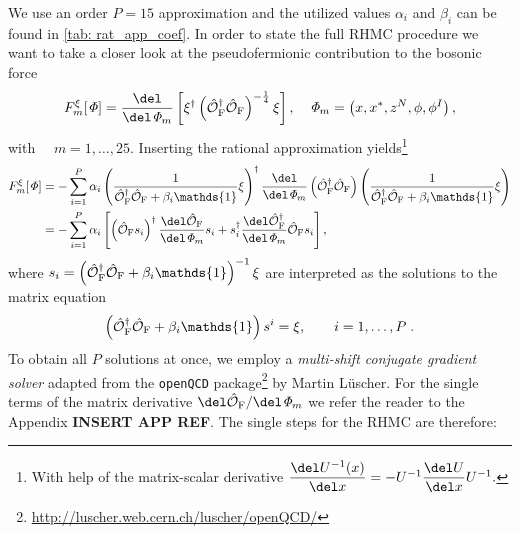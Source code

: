 %
%
We use an order $P=15$ approximation and the utilized values $\alpha_{i}$ and $\beta_{i}$ can be found in \autoref{tab: rat_app_coef}. In order to state the full RHMC procedure we want to take  a closer look at the pseudofermionic contribution to the bosonic force
%
%
\begin{equation}
F_{m}^{\xi}[\mathit{\Phi}] = \frac{\del }{\del \mathit{\Phi}_{m}}\left[ \xi^{\dagger}\left(\hat{\mathcal{O}}_{\rm F}^{\dagger}\hat{\mathcal{O}}_{\rm F}\right)^{-\frac{1}{4}} \xi \right], \quad \mathit{\Phi}_{m} = \left(x,x^{*},z^{N},\phi,\phi^{I}\right),
\end{equation}
%
%
with $\quad m=1,\ldots,25$. Inserting the rational approximation yields\footnote{With help of the matrix-scalar derivative 
$\dfrac{\del U^{-1}(x)}{\del x} = -U^{-1}\dfrac{\del U}{\del x} U^{-1}.$ \vspace{0.2cm}}
%
%
\begin{equation}
\begin{alignedat}{2}
F_{m}^{\xi}[\mathit{\Phi}] &= - \sum\limits_{i=1}^{P} \alpha_{i} \left(\frac{1}{\hat{\mathcal{O}}_{\rm F}^{\dagger}\hat{\mathcal{O}}_{\rm F}+\beta_{i}\mathds{1}} \xi \right)^{\dagger} \frac{\del }{\del \mathit{\Phi}_{m}}\left(\hat{\mathcal{O}}_{\rm F}^{\dagger}\hat{\mathcal{O}}_{\rm F}\right) \left(\frac{1}{\hat{\mathcal{O}}_{\rm F}^{\dagger}\hat{\mathcal{O}}_{\rm F}+\beta_{i}\mathds{1}} \xi \right) \\
%
%
&= -\sum\limits_{i=1}^{P} \alpha_{i}\left[ \left(\hat{\mathcal{O}}_{\rm F} s_{i}\right)^{\dagger} \frac{\del \hat{\mathcal{O}}_{\rm F}}{\del \mathit{\Phi}_{m}} s_{i} + s_{i}^{\dagger} \frac{\del \hat{\mathcal{O}}_{\rm F}^{\dagger}}{\del \mathit{\Phi}_{m}} \hat{\mathcal{O}}_{\rm F} s_{i} \right],
\end{alignedat}
\end{equation}
%
%
where $s_{i}= \left(\hat{\mathcal{O}}_{\rm F}^{\dagger}\hat{\mathcal{O}}_{\rm F}+\beta_{i}\mathds{1}\right)^{-1}\xi$ are interpreted as the solutions to the matrix equation
%
%
\begin{equation}
\left(\hat{\mathcal{O}}_{\rm F}^{\dagger}\hat{\mathcal{O}}_{\rm F}+\beta_{i}\mathds{1}\right) s^{i} = \xi, \qquad i=1,\ldots,P \;.
\end{equation}
%
%
To obtain all $P$ solutions at once, we employ a \textit{multi-shift conjugate gradient solver} adapted from the \texttt{openQCD} package\footnote{\url{http://luscher.web.cern.ch/luscher/openQCD/}} by Martin Lüscher. For the single terms of the matrix derivative $\del \hat{\mathcal{O}}_{\rm F} / \del \mathit{\Phi}_{m}$ we refer the reader to the Appendix \textbf{{\LARGE INSERT APP REF}}. The single steps for the RHMC are therefore:
